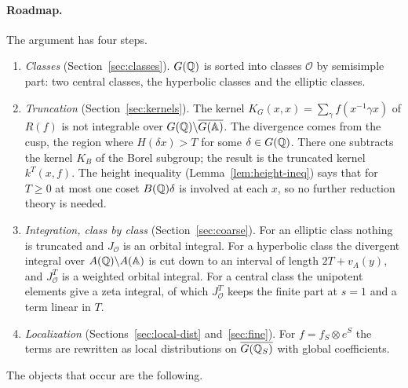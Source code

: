 \paragraph{Roadmap.} The argument has four steps.
\begin{enumerate}[label=\arabic*.]
\item \emph{Classes} (Section~\ref{sec:classes}). $G(\mathbb{Q})$ is sorted into
  classes $\mathcal O$ by semisimple part: two central classes, the
  hyperbolic classes and the elliptic classes.
\item \emph{Truncation} (Section~\ref{sec:kernels}). The kernel
  $K_G(x,x)=\sum_\gamma f(x^{-1}\gamma x)$ of $R(f)$ is not integrable
  over $G(\mathbb{Q})\backslash\overline{G(\mathbb{A})}$. The divergence comes from the cusp, the
  region where $H(\delta x)>T$ for some $\delta\in G(\mathbb{Q})$. There one
  subtracts the kernel $K_B$ of the Borel subgroup; the result is the
  truncated kernel $k^T(x,f)$. The height inequality
  (Lemma~\ref{lem:height-ineq}) says that for $T\ge0$ at most one coset
  $B(\mathbb{Q})\delta$ is involved at each $x$, so no further reduction theory is
  needed.
\item \emph{Integration, class by class} (Section~\ref{sec:coarse}). For
  an elliptic class nothing is truncated and $J_{\mathcal O}$ is an
  orbital integral. For a hyperbolic class the divergent integral over
  $A(\mathbb{Q})\backslash A(\mathbb{A})$ is cut down to an interval of length
  $2T+v_A(y)$, and $J^T_{\mathcal O}$ is a weighted orbital integral. For
  a central class the unipotent elements give a zeta integral, of which
  $J^T_{\mathcal O}$ keeps the finite part at $s=1$ and a term linear in
  $T$.
\item \emph{Localization} (Sections~\ref{sec:local-dist}
  and~\ref{sec:fine}). For $f=f_S\otimes e^S$ the terms are rewritten as
  local distributions on $\overline{G(\mathbb{Q}_S)}$ with global coefficients.
\end{enumerate}
The objects that occur are the following.
